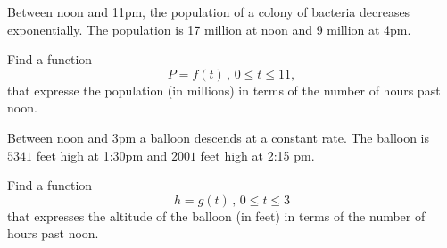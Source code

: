 \documentclass{ximera}
\begin{document}
\begin{question}  \label{Q87d6fgte}
Between noon and 11pm, the population of a colony of bacteria decreases exponentially. The population is 17 million at noon and 9 million at 4pm.

Find a function
\[
        P = f(t) \, , \, 0\leq t \leq 11 ,
\]
that expresse the population (in millions) in terms of the number of hours past noon.
\end{question}


\begin{question}  \label{Q98d33dg5r5r3}
Between noon and 3pm a balloon descends at a constant rate. The balloon is $5341$ feet high at 1:30pm and $2001$ feet high at 2:15 pm.

Find a function
\[
      h = g(t) \, , \, 0\leq t \leq 3
\]
that expresses the altitude of the balloon (in feet) in terms of the number of hours past noon.
\end{question}
\end{document}
